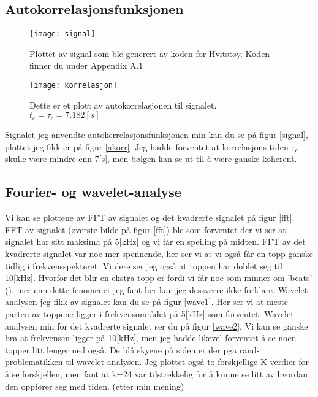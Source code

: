 \documentclass[a4paper,12pt,norsk]{article}
\begin{document}
\subsection{Autokorrelasjonsfunksjonen}
\begin{figure}[h!]
\texttt{[image: signal]}\\
\caption[Signal]{Plottet av signal som ble generert av koden for Hvitstøy. Koden finner du under Appendix A.1}
\label{signal}
\end{figure}

\begin{figure}[h!]
\texttt{[image: korrelasjon]}\\
\caption[Autokorrelasjon]{Dette er et plott av autokorrelasjonen til signalet. $t_c = \tau_c = 7.182 [s]$}
\label{akorr}
\end{figure}
Signalet jeg anvendte autokerrelasjonsfunksjonen min kan du se på figur \vref{signal}, plottet jeg fikk er på figur \vref{akorr}. Jeg hadde forventet at korrelasjons tiden $\tau_c$ skulle være mindre enn 7[s], men bølgen kan se ut til å være ganske koherent.


\subsection{Fourier- og wavelet-analyse}
Vi kan se plottene av FFT av signalet og det kvadrerte signalet på figur \vref{fft}. 
FFT av signalet (øverste bilde på figur \ref{fft}) ble som forventet der vi ser at signalet har sitt maksima på 5[kHz] og vi får en speiling på midten. FFT av det kvadrerte signalet var noe mer spennende, her ser vi at vi også får en topp ganske tidlig i frekvensspekteret. Vi dere ser jeg også at toppen har doblet seg til 10[kHz]. Hvorfor det blir en ekstra topp er fordi vi får noe som minner om 'beats' (\cite{grl}), mer enn dette fenomenet jeg fant her kan jeg dessverre ikke forklare. Wavelet analysen jeg fikk av signalet kan du se på figur \vref{wave1}. Her ser vi at meste parten av toppene ligger i frekvensområdet på 5[kHz] som forventet. Wavelet analysen min for det kvadrerte signalet ser du på figur \vref{wave2}. Vi kan se ganske bra at frekvensen ligger på 10[kHz], men jeg hadde likevel forventet å se noen topper litt lenger ned også. De blå skyene på siden er der pga rand-problematikken til wavelet analysen. Jeg plottet også to forskjellige K-verdier for å se forskjellen, men fant at k=24 var tilstrekkelig for å kunne se litt av hvordan den oppfører seg med tiden. (etter min mening)
\end{document}
